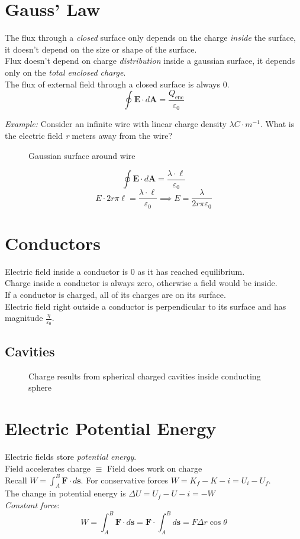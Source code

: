 \section{Gauss' Law}
The flux through a \emph{closed} surface only depends on the charge \emph{inside} the surface, it doesn’t depend on the size or shape of the surface.\\
Flux doesn’t depend on charge \emph{distribution} inside a gaussian surface, it depends only on the \emph{total enclosed charge}.\\
The flux of external field through a closed surface is always 0. 
$$\oint\mathbf{E}\cdot d\mathbf{A}=\frac{Q_{\text{enc}}}{\varepsilon_0}$$

\emph{Example:}
Consider an infinite wire with linear charge density $\lambda C\cdot m^{-1}$. What is the electric field \emph{r} meters away from the wire?
\begin{figure}[H]
    \centering
    
    \caption{Gaussian surface around wire}
\end{figure}
$$\oint\mathbf{E}\cdot d\mathbf{A}=\frac{\lambda\cdot\ell}{\varepsilon_0}$$
$$E\cdot{2r\pi\ell}=\frac{\lambda\cdot\ell}{\varepsilon_0}\implies E=\frac{\lambda}{2r\pi\varepsilon_0}$$
\section{Conductors}
Electric field inside a conductor is 0 as it has reached equilibrium.\\
Charge inside a conductor is always zero, otherwise a field would be inside.\\
If a conductor is charged, all of its charges are on its surface.\\
Electric field right outside a conductor is perpendicular to its surface and has magnitude $\frac{\eta}{\varepsilon_0}$.
\subsection{Cavities}
\begin{figure}[H]
    \centering
    
    \caption{Charge results from spherical charged cavities inside conducting sphere}
\end{figure}
\section{Electric Potential Energy}
Electric fields store \emph{potential energy}.\\
Field accelerates charge $\equiv$ Field does work on charge\\
Recall $W = \int_A^B\mathbf{F}\cdot d\mathbf{s}$. For conservative forces $W=K_f-K-i=U_i-U_f$.\\
The change in potential energy is $\Delta U=U_f-U-i=-W$\\
\emph{Constant force}:
$$W=\int_A^B\mathbf{F}\cdot d\mathbf{s}=\mathbf{F}\cdot\int_A^Bd\mathbf{s}=F\Delta r\cos\theta$$
